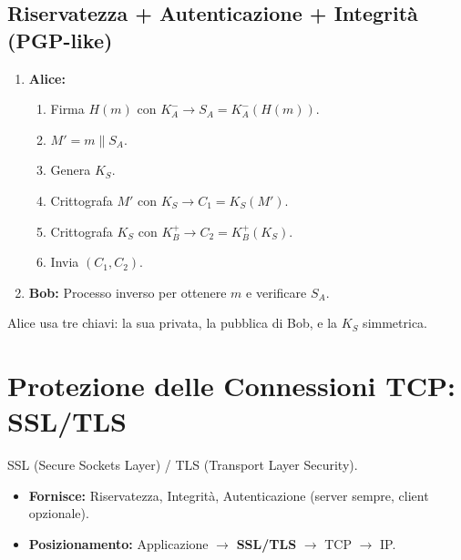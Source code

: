 \subsection{Riservatezza + Autenticazione + Integrità (PGP-like)}
\begin{enumerate}
    \item \textbf{Alice:}
    \begin{enumerate}
        \item Firma $H(m)$ con $K_A^- \rightarrow S_A = K_A^-(H(m))$.
        \item $M' = m \mathbin{\|} S_A$.
        \item Genera $K_S$.
        \item Crittografa $M'$ con $K_S \rightarrow C_1 = K_S(M')$.
        \item Crittografa $K_S$ con $K_B^+ \rightarrow C_2 = K_B^+(K_S)$.
        \item Invia $(C_1, C_2)$.
    \end{enumerate}
    \item \textbf{Bob:}
    Processo inverso per ottenere $m$ e verificare $S_A$.
\end{enumerate}
Alice usa tre chiavi: la sua privata, la pubblica di Bob, e la $K_S$ simmetrica.

\section{Protezione delle Connessioni TCP: SSL/TLS}
\label{sec:ssl_tls}
SSL (Secure Sockets Layer) / TLS (Transport Layer Security).

\begin{itemize}
    \item \textbf{Fornisce:} Riservatezza, Integrità, Autenticazione (server sempre, client opzionale).
    \item \textbf{Posizionamento:} Applicazione $\rightarrow$ \textbf{SSL/TLS} $\rightarrow$ TCP $\rightarrow$ IP.
\end{itemize}

